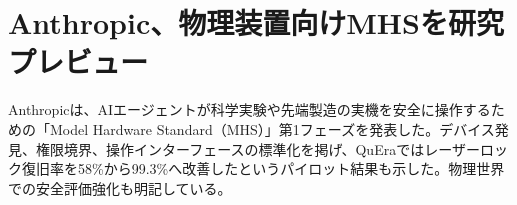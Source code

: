 \section{Anthropic、物理装置向けMHSを研究プレビュー}
Anthropicは、AIエージェントが科学実験や先端製造の実機を安全に操作するための「Model Hardware Standard（MHS）」第1フェーズを発表した。デバイス発見、権限境界、操作インターフェースの標準化を掲げ、QuEraではレーザーロック復旧率を58\%から99.3\%へ改善したというパイロット結果も示した。物理世界での安全評価強化も明記している。
